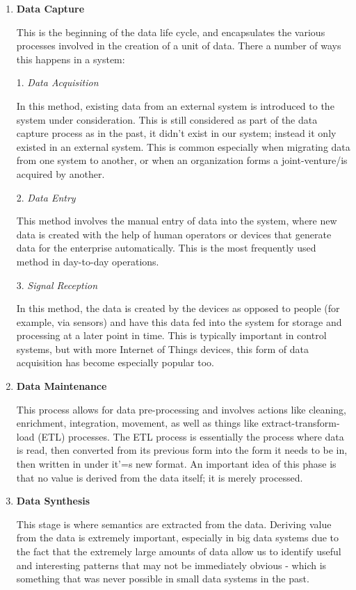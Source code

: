 \documentclass{sigchi}
\begin{document}
\begin{enumerate}
\item \textbf{Data Capture}

This is the beginning of the data life cycle, and encapsulates the various processes involved in the creation of a unit of data. There a number of ways this happens in a system:

1. \textit{Data Acquisition}

In this method, existing data from an external system is introduced to the system under consideration. This is still considered as part of the data capture process as in the past, it didn't exist in our system; instead it only existed in an external system. This is common especially when migrating data from one system to another, or when an organization forms a joint-venture/is acquired by another.

2. \textit{Data Entry}

This method involves the manual entry of data into the system, where new data is created with the help of human operators or devices that generate data for the enterprise automatically. This is the most frequently used method in day-to-day operations.

3. \textit{Signal Reception}

In this method, the data is created by the devices as opposed to people (for example, via sensors) and have this data fed into the system for storage and processing at a later point in time. This is typically important in control systems, but with more Internet of Things devices, this form of data acquisition has become especially popular too.

\item \textbf{Data Maintenance}

This process allows for data pre-processing and involves actions like cleaning, enrichment, integration, movement, as well as things like extract-transform-load (ETL) processes. The ETL process is essentially the process where data is read, then converted from its previous form into the form it needs to be in, then written in under it'=s new format. An important idea of this phase is that no value is derived from the data itself; it is merely processed.

\item \textbf{Data Synthesis}

This stage is where semantics are extracted from the data. Deriving value from the data is extremely important, especially in big data systems due to the fact that the extremely large amounts of data allow us to identify useful and interesting patterns that may not be immediately obvious - which is something that was never possible in small data systems in the past.


\end{enumerate}
\end{document}
